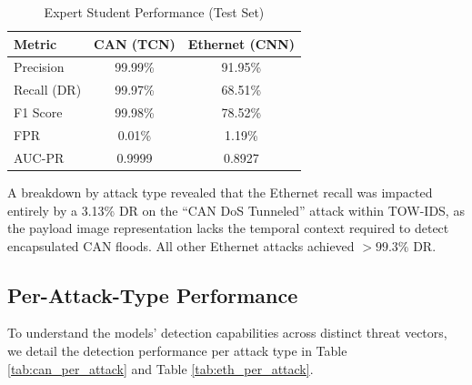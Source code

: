 \documentclass[conference]{IEEEtran}
\begin{document}
\begin{table}[H]
\centering
\caption{Expert Student Performance (Test Set)}
\label{tab:expert_performance}
\begin{tabular}{lcc}
\toprule
\textbf{Metric} & \textbf{CAN (TCN)} & \textbf{Ethernet (CNN)} \\
\midrule
Precision & 99.99\% & 91.95\% \\
Recall (DR) & 99.97\% & 68.51\% \\
F1 Score & 99.98\% & 78.52\% \\
FPR & 0.01\% & 1.19\% \\
AUC-PR & 0.9999 & 0.8927 \\
\bottomrule
\end{tabular}
\end{table}

A breakdown by attack type revealed that the Ethernet recall was impacted entirely by a 3.13\% DR on the ``CAN DoS Tunneled'' attack within TOW-IDS, as the payload image representation lacks the temporal context required to detect encapsulated CAN floods. All other Ethernet attacks achieved $>99.3\%$ DR.

\begin{table}[H]
\centering
\caption{Distillation Ablation (Validation Set)}
\label{tab:ablation}
\resizebox{\columnwidth}{!}{%

}
\end{table}

\subsection{Per-Attack-Type Performance}
To understand the models' detection capabilities across distinct threat vectors, we detail the detection performance per attack type in Table \ref{tab:can_per_attack} and Table \ref{tab:eth_per_attack}.

\begin{table}[H]
\centering
\caption{CAN Performance per Attack Type}
\label{tab:can_per_attack}

\end{table}

\begin{table}[H]
\centering
\caption{Ethernet Performance per Attack Type}
\label{tab:eth_per_attack}

\end{table}
\end{document}
